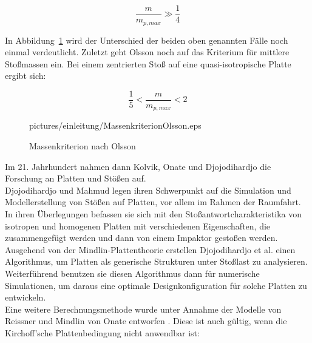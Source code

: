 \begin{equation}
	\frac{m}{m_{p,max}} \gg \frac{1}{4}
\end{equation}

In Abbildung~\ref{fig:Olsson} wird der Unterschied der beiden oben genannten Fälle noch einmal verdeutlicht. Zuletzt geht Olsson noch auf das Kriterium für mittlere Stoßmassen ein. Bei einem zentrierten Stoß auf eine quasi-isotropische Platte ergibt sich:

\begin{equation}
	\frac{1}{5} < \frac{m}{m_{p,max}} < 2
\end{equation}


\begin{figure}[H]
	\begin{center}
		\begin{overpic}[width=\linewidth]{pictures/einleitung/MassenkriterionOlsson.eps}
					
		\end{overpic}	
		\caption{Massenkriterion nach Olsson}	
		\label{fig:Olsson}
	\end{center}
\end{figure}


Im 21. Jahrhundert nahmen dann Kolvik\cite{Kolvik.May2012}, Onate\cite{Onate.} und Djojodihardjo\cite{Djojodihardjo.2015} die Forschung an Platten und Stößen auf.\\
Djojodihardjo und Mahmud\cite{Djojodihardjo.2015} legen ihren Schwerpunkt auf die Simulation und Modellerstellung von Stößen auf Platten, vor allem im Rahmen der Raumfahrt. In ihren Überlegungen befassen sie sich mit den Stoßantwortcharakteristika von isotropen und homogenen Platten mit verschiedenen Eigenschaften, die zusammengefügt werden und dann von einem Impaktor gestoßen werden. Ausgehend von der Mindlin-Plattentheorie erstellen Djojodihardjo et al. einen Algorithmus, um Platten als generische Strukturen unter Stoßlast zu analysieren. Weiterführend benutzen sie diesen Algorithmus dann für numerische Simulationen, um daraus eine optimale Designkonfiguration für solche Platten zu entwickeln.\\
Eine weitere Berechnungsmethode wurde unter Annahme der Modelle von Reissner und Mindlin von Onate entworfen \cite{Onate.}. Diese ist auch gültig, wenn die Kirchoff'sche Plattenbedingung nicht anwendbar ist:

